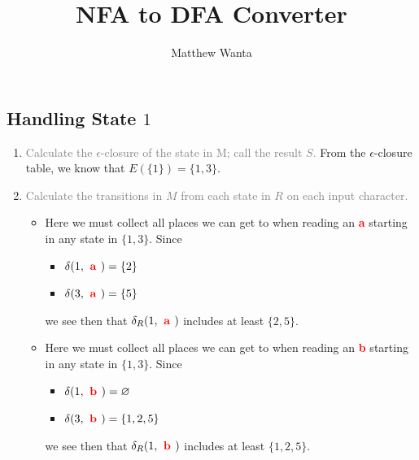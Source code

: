 \documentclass{article}
\begin{document}
\title{\textbf{NFA to DFA Converter}}
\author{Matthew Wanta}
\date{}
\maketitle
\thispagestyle{fancy}



\subsection*{Handling State $1$}

\begin{enumerate}
    \item \textcolor{gray}{Calculate the $\epsilon$-closure of the state in M; call the result $S$.} 
    From the $\epsilon$-closure table, we know that $E(\{ 1 \})=\{ {1, 3} \}$. 
    
    \item \textcolor{gray}{Calculate the transitions in $M$ from each state in $R$ on each input character.} 
    \begin{itemize}
        
            \item [\textcolor{red}{\textbf{ a }}] 
            Here we must collect all places we can get to when reading an \textcolor{red}{\textbf{ a }}
            starting in any state in $\{ {1, 3} \}$. 
            Since
            \begin{itemize}\item $\delta(1, \textcolor{red}{\textbf{ a }}) = \{2\}
$\item $\delta(3, \textcolor{red}{\textbf{ a }}) = \{5\}
$
            \end{itemize}
            we see then that $\delta_R(1,\textcolor{red}{\textbf{ a }})$ includes at least $\{ {2, 5} \}$.
        
            \item [\textcolor{red}{\textbf{ b }}] 
            Here we must collect all places we can get to when reading an \textcolor{red}{\textbf{ b }}
            starting in any state in $\{ {1, 3} \}$. 
            Since
            \begin{itemize}\item $\delta(1, \textcolor{red}{\textbf{ b }}) = \varnothing
$\item $\delta(3, \textcolor{red}{\textbf{ b }}) = \{1,2,5\}
$
            \end{itemize}
            we see then that $\delta_R(1,\textcolor{red}{\textbf{ b }})$ includes at least $\{ {1, 2, 5} \}$.
        

\end{itemize}
\end{enumerate}
\end{document}
